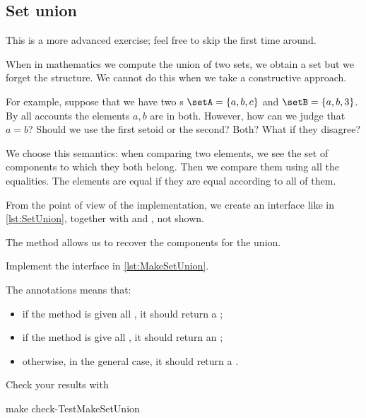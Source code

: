 
\subsection{Set union \hardexercise}
\begin{remark}
This is a more advanced exercise; feel free to skip the first time around.
\end{remark}


When in mathematics we compute the union of two sets, we obtain a set but we forget the structure. We cannot do this when we take a constructive approach.

For example, suppose that we have two \Setoid{}s $\setA = \{a,b,c\}$ and $\setB = \{a,b,3\}$.
By all accounts the elements $a,b$ are in both. However, how can we judge that $a=b$? Should we use the first setoid or the second? Both? What if they disagree?

We choose this semantics: when comparing two elements, we see the set of components to which they both belong. Then we compare them using all the equalities. The elements are equal if they are equal according to all of them.

From the point of view of the implementation, we create an interface like
in \cref{lst:SetUnion}, together with \EnumerableSetUnion and \FiniteSetUnion, not shown.


The method  allows us to recover the components for the union.

\begin{codeexercise}
  Implement the interface in \cref{lst:MakeSetUnion}.
\end{codeexercise}

The  annotations means that:
   \begin{itemize}
   \item if the method is given all \FiniteSet, it should return a \FiniteSet;
    \item if the method is give all \EnumerableSet, it should return an \EnumerableSet;
    \item otherwise, in the general case, it should return a \Setoid.
    \end{itemize}


Check your results with
\begin{console}
  make check-TestMakeSetUnion
\end{console}


